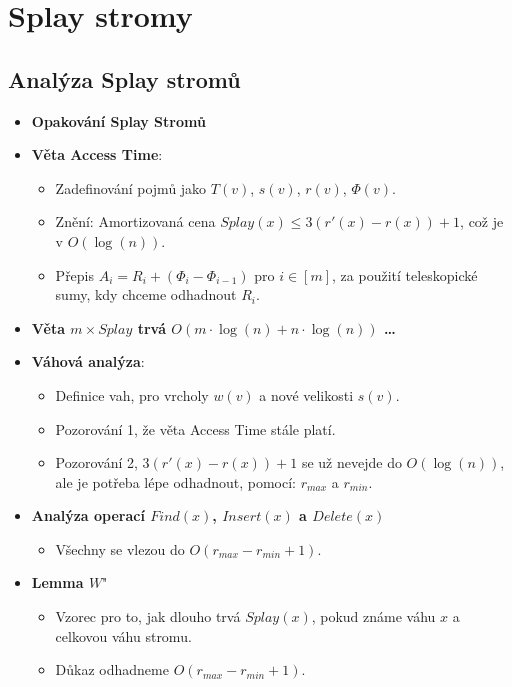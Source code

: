 \documentclass[11pt,a4paper]{article}
\begin{document}
\section{Splay stromy}
\subsection{Analýza Splay stromů}
    \begin{itemize}
        \item \textbf{Opakování Splay Stromů}
        \item \textbf{Věta Access Time}:
        \begin{itemize}
            \item Zadefinování pojmů jako $T(v)$, $s(v)$, $r(v)$, $\Phi(v)$.
            \item Znění: Amortizovaná cena $Splay(x)\leq 3(r'(x)-r(x))+1$, což je v $O(\log(n))$.
            \item Přepis $A_i = R_i + (\Phi_i -\Phi_{i-1})$ pro $i\in[m]$, za použití teleskopické sumy, kdy chceme odhadnout $R_i$. 
        \end{itemize}
        \item \textbf{Věta $m \times Splay$ trvá $O(m\cdot \log(n) + n \cdot \log(n))$ \dots} 
        \item \textbf{Váhová analýza}:
        \begin{itemize}
            \item Definice vah, pro vrcholy $w(v)$ a nové velikosti $s(v)$.
            \item Pozorování 1, že věta Access Time stále platí.
            \item Pozorování 2, $3(r'(x) -r(x))+1$ se už nevejde do $ O(\log(n))$, ale je potřeba lépe odhadnout, pomocí: $r_{max}$ a $r_{min}$.
        \end{itemize}
        \item \textbf{Analýza operací $Find(x)$, $Insert(x)$ a $Delete(x)$}
        \begin{itemize}
            \item Všechny se vlezou do $O(r_{max}-r_{min} + 1)$.
        \end{itemize}
        \item \textbf{Lemma $W$}"
        \begin{itemize}
            \item Vzorec pro to, jak dlouho trvá $Splay(x)$, pokud známe váhu $x$ a celkovou váhu stromu.
            \item Důkaz odhadneme $O(r_{max}-r_{min} + 1)$.

\end{itemize}
\end{itemize}
\end{document}
